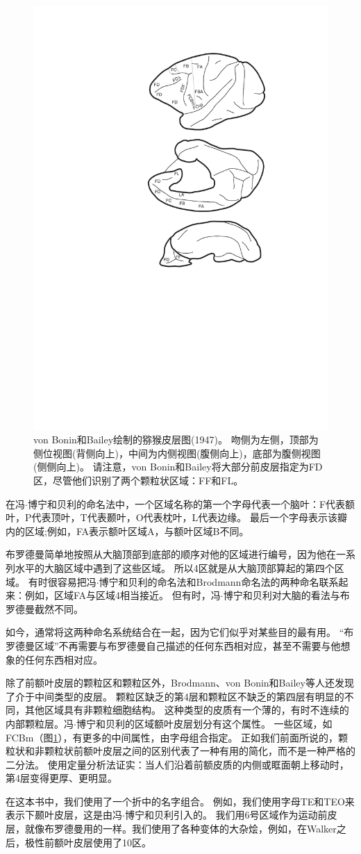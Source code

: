 \begin{figure}[!htb]
	\centering
	\includegraphics[width=0.5\linewidth]{chap1/1_1}
	\caption{von Bonin和Bailey绘制的猕猴皮层图(1947)。
		吻侧为左侧，顶部为侧位视图(背侧向上)，中间为内侧视图(腹侧向上)，底部为腹侧视图(侧侧向上)。
		请注意，von Bonin和Bailey将大部分前皮层指定为FD区，尽管他们识别了两个颗粒状区域：FF和FL\cite{von1947neocortex}。\label{fig:1_1}}
\end{figure}

\par
在冯$\cdot$博宁和贝利的命名法中，一个区域名称的第一个字母代表一个脑叶：F代表额叶，P代表顶叶，T代表颞叶，O代表枕叶，L代表边缘。
最后一个字母表示该瓣内的区域;例如，FA表示额叶区域A，与额叶区域B不同。
\par
布罗德曼简单地按照从大脑顶部到底部的顺序对他的区域进行编号，因为他在一系列水平的大脑区域中遇到了这些区域。
所以4区就是从大脑顶部算起的第四个区域。
有时很容易把冯$\cdot$博宁和贝利的命名法和Brodmann命名法的两种命名联系起来：例如，区域FA与区域4相当接近。
但有时，冯$\cdot$博宁和贝利对大脑的看法与布罗德曼截然不同。
\par
如今，通常将这两种命名系统结合在一起，因为它们似乎对某些目的最有用。
“布罗德曼区域”不再需要与布罗德曼自己描述的任何东西相对应，甚至不需要与他想象的任何东西相对应。
\par
除了前额叶皮层的颗粒区和颗粒区外，Brodmann、von Bonin和Bailey等人还发现了介于中间类型的皮层。
颗粒区缺乏的第4层和颗粒区不缺乏的第四层有明显的不同，其他区域具有非颗粒细胞结构。
这种类型的皮质有一个薄的，有时不连续的内部颗粒层。冯$\cdot$博宁和贝利的区域额叶皮层划分有这个属性。
一些区域，如FCBm（图\ref{fig:1_1}），有更多的中间属性，由字母组合指定。
正如我们前面所说的，颗粒状和非颗粒状前额叶皮层之间的区别代表了一种有用的简化，而不是一种严格的二分法。
使用定量分析法证实：当人们沿着前额皮质的内侧或眶面朝上移动时，第4层变得更厚、更明显\cite{mackey2010quantitative}。
\par
在这本书中，我们使用了一个折中的名字组合。
例如，我们使用字母TE和TEO来表示下颞叶皮层，这是由冯$\cdot$博宁和贝利引入的。
我们用6号区域作为运动前皮层，就像布罗德曼用的一样。我们使用了各种变体的大杂烩，例如，在Walker\cite{walker1940cytoarchitectural}之后，极性前额叶皮层使用了10区。



